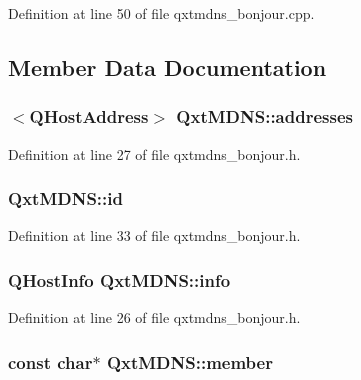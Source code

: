 Definition at line 50 of file qxtmdns\-\_\-bonjour.\-cpp.



\subsection{Member Data Documentation}
\hypertarget{class_qxt_m_d_n_s_a56517d9b9e3d792781581ae1378f8c5f}{
\subsubsection[{addresses}]{$<$Q\-Host\-Address$>$ Qxt\-M\-D\-N\-S\-::addresses}}\label{class_qxt_m_d_n_s_a56517d9b9e3d792781581ae1378f8c5f}


Definition at line 27 of file qxtmdns\-\_\-bonjour.\-h.

\hypertarget{class_qxt_m_d_n_s_a3dd3743f39cee3cdb18253f1b34cd448}{
\subsubsection[{id}]{ Qxt\-M\-D\-N\-S\-::id}}\label{class_qxt_m_d_n_s_a3dd3743f39cee3cdb18253f1b34cd448}


Definition at line 33 of file qxtmdns\-\_\-bonjour.\-h.

\hypertarget{class_qxt_m_d_n_s_aa59fedd01d3a81b4e9e4ab23efe02805}{
\subsubsection[{info}]{\setlength{\rightskip}{0pt plus 5cm}Q\-Host\-Info Qxt\-M\-D\-N\-S\-::info}}\label{class_qxt_m_d_n_s_aa59fedd01d3a81b4e9e4ab23efe02805}


Definition at line 26 of file qxtmdns\-\_\-bonjour.\-h.

\hypertarget{class_qxt_m_d_n_s_a1f0da55979f7015f74686e51c8759a71}{
\subsubsection[{member}]{\setlength{\rightskip}{0pt plus 5cm}const char$\ast$ Qxt\-M\-D\-N\-S\-::member}}\label{class_qxt_m_d_n_s_a1f0da55979f7015f74686e51c8759a71}


